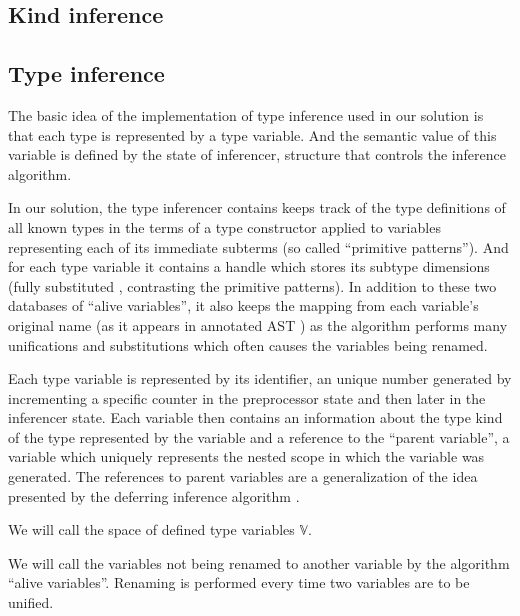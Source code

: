 \subsection{Kind inference}


\subsection{Type inference}

The basic idea of the implementation of type inference used in our solution is that each type is represented by a type variable. And the semantic value of this variable is defined by the state of inferencer, structure that controls the inference algorithm.

In our solution, the type inferencer contains keeps track of the type definitions of all known types in the terms of a type constructor applied to variables representing each of its immediate subterms (so called ``primitive patterns''). And for each type variable it contains a handle which stores its subtype dimensions (fully substituted , contrasting the primitive patterns). In addition to these two databases of ``alive variables'', it also keeps the mapping from each variable's original name (as it appears in annotated AST ) as the algorithm performs many unifications and substitutions which often causes the variables being renamed.

\begin{defn}
    Each type variable is represented by its identifier, an unique number generated by incrementing a specific counter in the preprocessor state  and then later in the inferencer state. Each variable then contains an information about the type kind of the type represented by the variable  and a reference to the ``parent variable'', a variable which uniquely represents the nested scope in which the variable was generated. The references to parent variables are a generalization of the idea presented by the deferring inference algorithm  .
    
    We will call the space of defined type variables $\mathbb{V}$.

    We will call the variables not being renamed to another variable by the algorithm ``alive variables''. Renaming is performed every time two variables are to be unified.
\end{defn}


